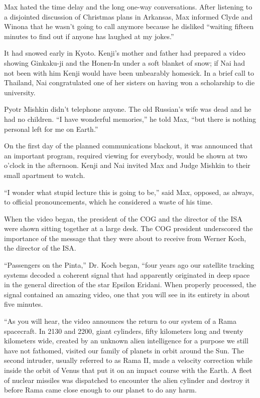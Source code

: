 \documentclass[]{article}
\begin{document}
{Max hated the time delay and the long one-way conversations. After listening to a disjointed discussion of Christmas plans in Arkansas, Max informed Clyde and Winona that he wasn’t going to call anymore because he disliked “waiting fifteen minutes to find out if anyone has laughed at my jokes.”

It had snowed early in Kyoto. Kenji’s mother and father had prepared a video showing Ginkaku-ji and the Honen-In under a soft blanket of snow; if Nai had not been with him Kenji would have been unbearably homesick. In a brief call to Thailand, Nai congratulated one of her sisters on having won a scholarship to die university.

Pyotr Mishkin didn’t telephone anyone. The old Russian’s wife was dead and he had no children. “I have wonderful memories,” he told Max, “but there is nothing personal left for me on Earth.”

On the first day of the planned communications blackout, it was announced that an important program, required viewing for everybody, would be shown at two o’clock in the afternoon. Kenji and Nai invited Max and Judge Mishkin to their small apartment to watch.

“I wonder what stupid lecture this is going to be,” said Max, opposed, as always, to official pronouncements, which he considered a waste of his time.

When the video began, the president of the COG and the director of the ISA were shown sitting together at a large desk. The COG president underscored the importance of the message that they were about to receive from Werner Koch, the director of the ISA.

“Passengers on the Pinta,” Dr. Koch began, “four years ago our satellite tracking systems decoded a coherent signal that had apparently originated in deep space in the general direction of the star Epsilon Eridani. When properly processed, the signal contained an amazing video, one that you will see in its entirety in about five minutes.

“As you will hear, the video announces the return to our system of a Rama spacecraft. In 2130 and 2200, giant cylinders, fifty kilometers long and twenty kilometers wide, created by an unknown alien intelligence for a purpose we still have not fathomed, visited our family of planets in orbit around the Sun. The second intruder, usually referred to as Rama II, made a velocity correction while inside the orbit of Venus that put it on an impact course with the Earth. A fleet of nuclear missiles was dispatched to encounter the alien cylinder and destroy it before Rama came close enough to our planet to do any harm.

}
\end{document}
